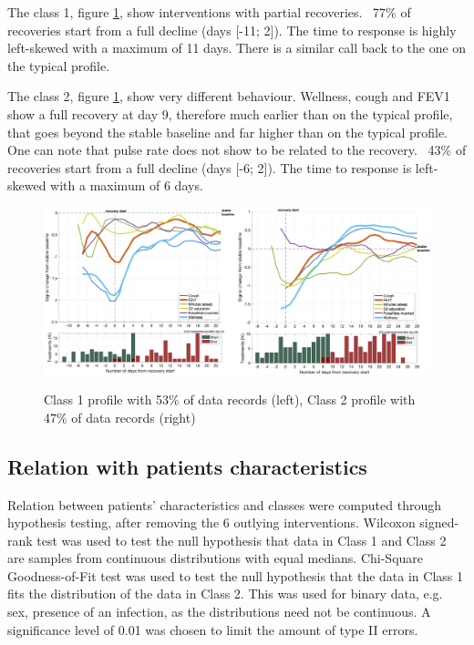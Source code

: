 The class 1, figure \ref{fig:profileC1C2}, show interventions with partial recoveries. ~77\% of recoveries start from a full decline (days [-11; 2]). The time to response is highly left-skewed with a maximum of 11 days. There is a similar call back to the one on the typical profile.

The class 2, figure \ref{fig:profileC1C2}, show very different behaviour. Wellness, cough and FEV1 show a full recovery at day 9, therefore much earlier than on the typical profile, that goes beyond the stable baseline and far higher than on the typical profile. One can note that pulse rate does not show to be related to the recovery. ~43\% of recoveries start from a full decline (days [-6; 2]). The time to response is left-skewed with a maximum of 6 days.

\begin{figure}[!h]
    \caption{Class 1 profile with 53\% of data records (left), Class 2 profile with 47\% of data records (right)}
    \centering
    \includegraphics[width=160mm]{images/nl2.png}
    \label{fig:profileC1C2}
\end{figure}

\subsection{Relation with patients characteristics}
Relation between patients' characteristics and classes were computed through hypothesis testing, after removing the 6 outlying interventions. Wilcoxon signed-rank test was used to test the null hypothesis that data in Class 1 and Class 2 are samples from continuous distributions with equal medians. Chi-Square Goodness-of-Fit test was used to test the null hypothesis that the data in Class 1 fits the distribution of the data in Class 2. This was used for binary data, e.g. sex, presence of an infection, as the distributions need not be continuous. A significance level of 0.01 was chosen to limit the amount of type II errors. 

